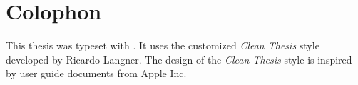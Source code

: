 \pagestyle{empty}
\hfill
\vfill
{}
\section*{Colophon}

This thesis was typeset with \LaTeXe.
It uses the customized \textit{Clean Thesis} style developed by Ricardo Langner.
The design of the \textit{Clean Thesis} style is inspired by user guide documents from Apple Inc.

